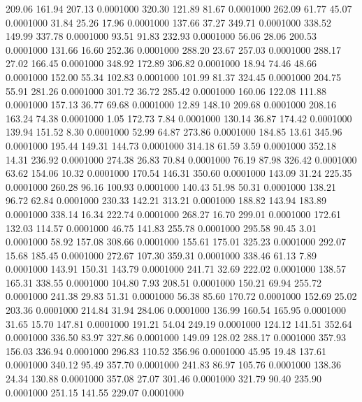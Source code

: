  209.06  161.94  207.13   0.0001000
 320.30  121.89   81.67   0.0001000
 262.09   61.77   45.07   0.0001000
  31.84   25.26   17.96   0.0001000
 137.66   37.27  349.71   0.0001000
 338.52  149.99  337.78   0.0001000
  93.51   91.83  232.93   0.0001000
  56.06   28.06  200.53   0.0001000
 131.66   16.60  252.36   0.0001000
 288.20   23.67  257.03   0.0001000
 288.17   27.02  166.45   0.0001000
 348.92  172.89  306.82   0.0001000
  18.94   74.46   48.66   0.0001000
 152.00   55.34  102.83   0.0001000
 101.99   81.37  324.45   0.0001000
 204.75   55.91  281.26   0.0001000
 301.72   36.72  285.42   0.0001000
 160.06  122.08  111.88   0.0001000
 157.13   36.77   69.68   0.0001000
  12.89  148.10  209.68   0.0001000
 208.16  163.24   74.38   0.0001000
   1.05  172.73    7.84   0.0001000
 130.14   36.87  174.42   0.0001000
 139.94  151.52    8.30   0.0001000
  52.99   64.87  273.86   0.0001000
 184.85   13.61  345.96   0.0001000
 195.44  149.31  144.73   0.0001000
 314.18   61.59    3.59   0.0001000
 352.18   14.31  236.92   0.0001000
 274.38   26.83   70.84   0.0001000
  76.19   87.98  326.42   0.0001000
  63.62  154.06   10.32   0.0001000
 170.54  146.31  350.60   0.0001000
 143.09   31.24  225.35   0.0001000
 260.28   96.16  100.93   0.0001000
 140.43   51.98   50.31   0.0001000
 138.21   96.72   62.84   0.0001000
 230.33  142.21  313.21   0.0001000
 188.82  143.94  183.89   0.0001000
 338.14   16.34  222.74   0.0001000
 268.27   16.70  299.01   0.0001000
 172.61  132.03  114.57   0.0001000
  46.75  141.83  255.78   0.0001000
 295.58   90.45    3.01   0.0001000
  58.92  157.08  308.66   0.0001000
 155.61  175.01  325.23   0.0001000
 292.07   15.68  185.45   0.0001000
 272.67  107.30  359.31   0.0001000
 338.46   61.13    7.89   0.0001000
 143.91  150.31  143.79   0.0001000
 241.71   32.69  222.02   0.0001000
 138.57  165.31  338.55   0.0001000
 104.80    7.93  208.51   0.0001000
 150.21   69.94  255.72   0.0001000
 241.38   29.83   51.31   0.0001000
  56.38   85.60  170.72   0.0001000
 152.69   25.02  203.36   0.0001000
 214.84   31.94  284.06   0.0001000
 136.99  160.54  165.95   0.0001000
  31.65   15.70  147.81   0.0001000
 191.21   54.04  249.19   0.0001000
 124.12  141.51  352.64   0.0001000
 336.50   83.97  327.86   0.0001000
 149.09  128.02  288.17   0.0001000
 357.93  156.03  336.94   0.0001000
 296.83  110.52  356.96   0.0001000
  45.95   19.48  137.61   0.0001000
 340.12   95.49  357.70   0.0001000
 241.83   86.97  105.76   0.0001000
 138.36   24.34  130.88   0.0001000
 357.08   27.07  301.46   0.0001000
 321.79   90.40  235.90   0.0001000
 251.15  141.55  229.07   0.0001000
